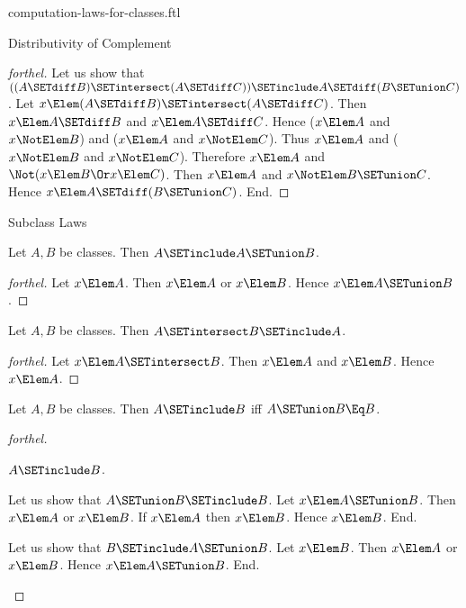 \documentclass{stex}
\begin{document}
\begin{smodule}{computation-laws-for-classes.ftl}
\begin{sfragment}{Distributivity of Complement}
\begin{proof}[forthel]
    Let us show that $((A \SETdiff B) \SETintersect (A \SETdiff C)) \SETinclude A \SETdiff (B \SETunion C)$. %
      Let $x \Elem (A \SETdiff B) \SETintersect (A \SETdiff C)$.
      Then $x \Elem A \SETdiff B$ and $x \Elem A \SETdiff C$.
      Hence ($x \Elem A$ and $x \NotElem B$) and ($x \Elem A$ and $x \NotElem C$).
      Thus $x \Elem A$ and ($x \NotElem B$ and $x \NotElem C$).
      Therefore $x \Elem A$ and $\Not(x \Elem B \Or x \Elem C)$.
      Then $x \Elem A$ and $x \NotElem B \SETunion C$.
      Hence $x \Elem A \SETdiff (B \SETunion C)$.
    End.
  \end{proof}
\end{sfragment}

\begin{sfragment}{Subclass Laws}
  \begin{proposition}[forthel]
    Let $A, B$ be classes.
    Then $A \SETinclude A \SETunion B$.
  \end{proposition}
  \begin{proof}[forthel]
    Let $x \Elem A$.
    Then $x \Elem A$ or $x \Elem B$.
    Hence $x \Elem A \SETunion B$.
  \end{proof}

  \begin{proposition}[forthel]
    Let $A, B$ be classes.
    Then $A \SETintersect B \SETinclude A$.
  \end{proposition}
  \begin{proof}[forthel]
    Let $x \Elem A \SETintersect B$.
    Then $x \Elem A$ and $x \Elem B$.
    Hence $x \Elem A$.
  \end{proof}

  \begin{proposition}[forthel]
    Let $A, B$ be classes.
    Then $A \SETinclude B$ iff $A \SETunion B \Eq B$.
  \end{proposition}
  \begin{proof}[forthel]
    \begin{case}{$A \SETinclude B$.}

      Let us show that $A \SETunion B \SETinclude B$.
        Let $x \Elem A \SETunion B$.
        Then $x \Elem A$ or $x \Elem B$.
        If $x \Elem A$ then $x \Elem B$.
        Hence $x \Elem B$.
      End.

      Let us show that $B \SETinclude A \SETunion B$.
        Let $x \Elem B$.
        Then $x \Elem A$ or $x \Elem B$.
        Hence $x \Elem A \SETunion B$.
      End.
    \end{case}


\end{proof}
\end{sfragment}
\end{smodule}
\end{document}
